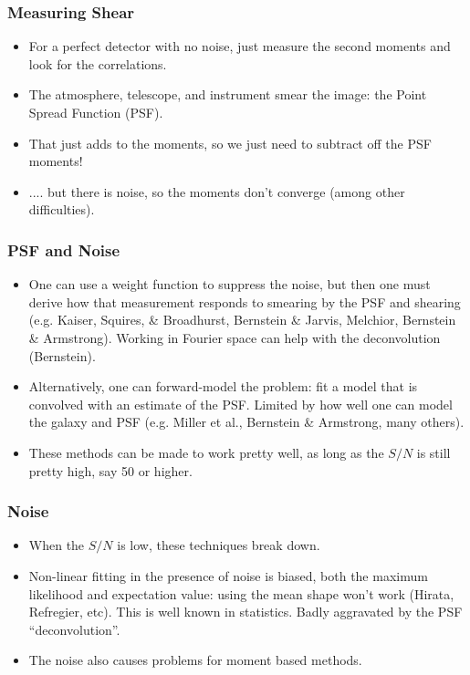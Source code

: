 \documentclass{beamer}
\begin{document}
\frame
{
    \frametitle{Measuring Shear}

    \begin{itemize}
        \item For a perfect detector with no noise, just measure
            the second moments and look for the correlations.
        \item The atmosphere, telescope, and instrument smear
            the image: the Point Spread Function (PSF).
        \item That just adds to the moments, so we just need to
            subtract off the PSF moments!
        \item .... but there is noise, so the moments don't converge (among
            other difficulties).
    \end{itemize}
}

\frame
{
    \frametitle{PSF and Noise}
    
    \begin{itemize}

        \item One can use a weight function to suppress the noise, but then one
            must derive how that measurement responds to smearing by the PSF
            and shearing (e.g. Kaiser, Squires, \& Broadhurst, Bernstein \& Jarvis, Melchior,
                    Bernstein \& Armstrong).  Working in Fourier space can help
            with the deconvolution (Bernstein).

        \item Alternatively, one can forward-model the problem: fit a model that is
            convolved with an estimate of the PSF.  Limited by how well one can
            model the galaxy and PSF (e.g. Miller et al., Bernstein \& Armstrong, many
            others).

        \item These methods can be made to work pretty well, as long as
            the $S/N$ is still pretty high, say 50 or higher.

    \end{itemize}
}

\frame
{
    \frametitle{Noise}

    \begin{itemize}
        \item When the $S/N$ is low, these techniques break down.
        \item Non-linear fitting in the presence of noise is biased, both
            the maximum likelihood and expectation value: using the mean
            shape won't work (Hirata, Refregier, etc).  This is well 
            known in statistics. Badly aggravated by the PSF ``deconvolution''.
        \item The noise also causes problems for moment based methods.
    \end{itemize}
}
\end{document}

